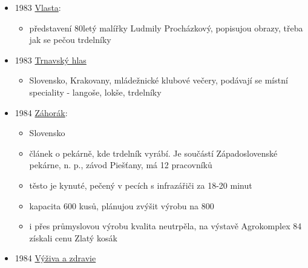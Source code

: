 \begin{itemize}
  \begin{itemize}
  \tightlist
  \item
    článek Lidové pečivo 1,
  \item
    zmínka, že trdelníky víceméně zanikly proto, že se dělaly na ohni
  \item
    v některejch obcích se ale trdelníky začalo řikat máslovejm
    trubičkám
  \end{itemize}
\item
  1983
  \href{https://ceskadigitalniknihovna.cz/view/uuid:a3661330-e99a-11e6-9964-005056825209?page=uuid\%3A83054300-e9a3-11e6-8010-005056827e51&fulltext=trdeln\%C3\%ADk\%20OR\%20trdeln\%C3\%ADky\%20OR\%20trdeln\%C3\%ADk\%C5\%AF&source=mzk}{Vlasta}:

  \begin{itemize}
  \tightlist
  \item
    představení 80letý malířky Ludmily Procházkový, popisujou obrazy,
    třeba jak se pečou trdelníky
  \end{itemize}
\item
  1983
  \href{https://dikda.snk.sk/uuid/uuid:b775b7f6-6bff-41ea-81f8-291194dc217c}{Trnavský
  hlas}

  \begin{itemize}
  \tightlist
  \item
    Slovensko, Krakovany, mládežnické klubové večery, podávají se místní
    speciality - langoše, lokše, trdelníky
  \end{itemize}
\item
  1984
  \href{https://dikda.snk.sk/uuid/uuid:f4d70313-b883-466c-972e-3cfd5e07a41e}{Záhorák}:

  \begin{itemize}
  \tightlist
  \item
    Slovensko
  \item
    článek o pekárně, kde trdelník vyrábí. Je součástí Západoslovenské
    pekárne, n. p., závod Piešťany, má 12 pracovníků
  \item
    těsto je kynuté, pečený v pecích s infrazářiči za 18-20 minut
  \item
    kapacita 600 kusů, plánujou zvýšit výrobu na 800
  \item
    i přes průmyslovou výrobu kvalita neutrpěla, na výstavě Agrokomplex
    84 získali cenu Zlatý kosák
  \end{itemize}
\item
  1984
  \href{https://dikda.snk.sk/uuid/uuid:b873200a-106a-429f-b02a-29e45a750c35}{Výživa
  a zdravie}


\end{itemize}

